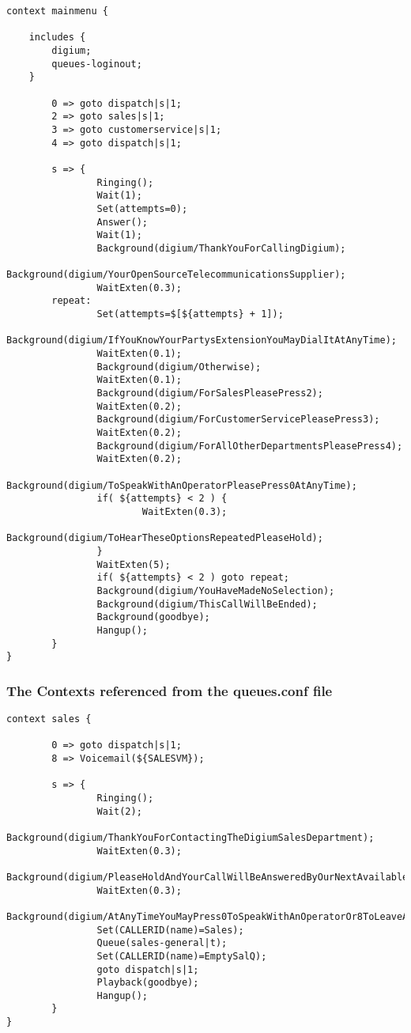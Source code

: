 \begin{verbatim}
context mainmenu {

	includes {
		digium;
		queues-loginout;
	}

        0 => goto dispatch|s|1;
        2 => goto sales|s|1;
        3 => goto customerservice|s|1;
        4 => goto dispatch|s|1;

        s => {
                Ringing();
                Wait(1);
                Set(attempts=0);
                Answer();
                Wait(1);
                Background(digium/ThankYouForCallingDigium);
                Background(digium/YourOpenSourceTelecommunicationsSupplier);
                WaitExten(0.3);
        repeat:
                Set(attempts=$[${attempts} + 1]);
                Background(digium/IfYouKnowYourPartysExtensionYouMayDialItAtAnyTime);
                WaitExten(0.1);
                Background(digium/Otherwise);
                WaitExten(0.1);
                Background(digium/ForSalesPleasePress2);
                WaitExten(0.2);
                Background(digium/ForCustomerServicePleasePress3);
                WaitExten(0.2);
                Background(digium/ForAllOtherDepartmentsPleasePress4);
                WaitExten(0.2);
                Background(digium/ToSpeakWithAnOperatorPleasePress0AtAnyTime);
                if( ${attempts} < 2 ) {
                        WaitExten(0.3);
                        Background(digium/ToHearTheseOptionsRepeatedPleaseHold);
                }
                WaitExten(5);
                if( ${attempts} < 2 ) goto repeat;
                Background(digium/YouHaveMadeNoSelection);
                Background(digium/ThisCallWillBeEnded);
                Background(goodbye);
                Hangup();
        }
}
\end{verbatim}

\subsubsection{The Contexts referenced from the queues.conf file}

\begin{verbatim}
context sales {

        0 => goto dispatch|s|1;
        8 => Voicemail(${SALESVM});

        s => {
                Ringing();
                Wait(2);
                Background(digium/ThankYouForContactingTheDigiumSalesDepartment);
                WaitExten(0.3);
                Background(digium/PleaseHoldAndYourCallWillBeAnsweredByOurNextAvailableSalesRepresentative);
                WaitExten(0.3);
                Background(digium/AtAnyTimeYouMayPress0ToSpeakWithAnOperatorOr8ToLeaveAMessage);
                Set(CALLERID(name)=Sales);
                Queue(sales-general|t);
                Set(CALLERID(name)=EmptySalQ);
                goto dispatch|s|1;
                Playback(goodbye);
                Hangup();
        }
}
\end{verbatim}

